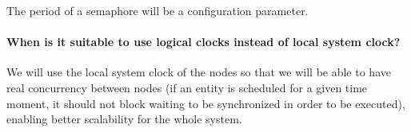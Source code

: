 The period of a semaphore will be a configuration parameter.

\paragraph{When is it suitable to use logical clocks instead of local system
  clock?}
We will use the local system clock of the nodes so that we will be able to
have real concurrency between nodes (if an entity is scheduled for a given
time moment, it should not block waiting to be synchronized in order to be
executed), enabling better scalability for the whole system.
